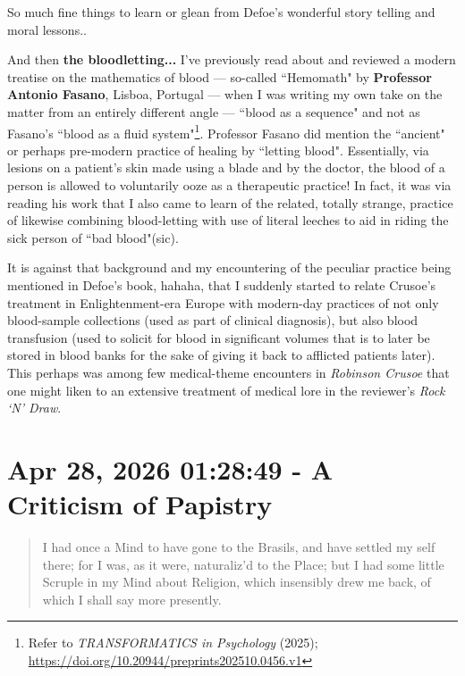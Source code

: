 \documentclass[a4paper]{article}
\begin{document}
So much fine things to learn or glean from Defoe's wonderful story telling and moral lessons.. 

And then \textbf{the bloodletting...} I've previously read about and reviewed a modern treatise on the mathematics of blood --- so-called ``Hemomath" by \textbf{Professor Antonio Fasano}, Lisboa, Portugal --- when I was writing my own take on the matter from an entirely different angle --- ``blood as a sequence" and not as Fasano's ``blood as a fluid system"\footnote{Refer to \textit{TRANSFORMATICS in Psychology} (2025); \url{https://doi.org/10.20944/preprints202510.0456.v1}}. Professor Fasano did mention the ``ancient" or perhaps pre-modern practice of healing by ``letting blood". Essentially, via lesions on a patient's skin made using a blade and by the doctor, the blood of a person is allowed to voluntarily ooze as a therapeutic practice! In fact, it was via reading his work that I also came to learn of the related, totally strange, practice of likewise combining blood-letting with use of literal leeches to aid in riding the sick person of ``bad blood"(sic). 

It is against that background and my encountering of the peculiar practice being mentioned in Defoe's book, hahaha, that I suddenly started to relate Crusoe's treatment in Enlightenment-era Europe with modern-day practices of not only blood-sample collections (used as part of clinical diagnosis), but also blood transfusion (used to solicit for blood in significant volumes that is to later be stored in blood banks for the sake of giving it back to afflicted patients later). This perhaps was among few medical-theme encounters in \textit{Robinson Crusoe} that one might liken to an extensive treatment of medical lore in the reviewer's \textit{Rock `N' Draw}.






\section{Apr 28, 2026 01:28:49 - A Criticism of Papistry}
\label{SEC72}


\noindent
\begin{minipage}{1\textwidth}
\vspace{1em}
\begin{quotation}
{\ttfamily


I had once a Mind to have gone to the Brasils, and have settled my self there; for I was, as it were, naturaliz’d to the Place; but I had some little Scruple in my Mind about Religion, which insensibly drew me back, of which I shall say more presently.


}
\end{quotation}
\vspace{1em}
\end{minipage}
\end{document}
